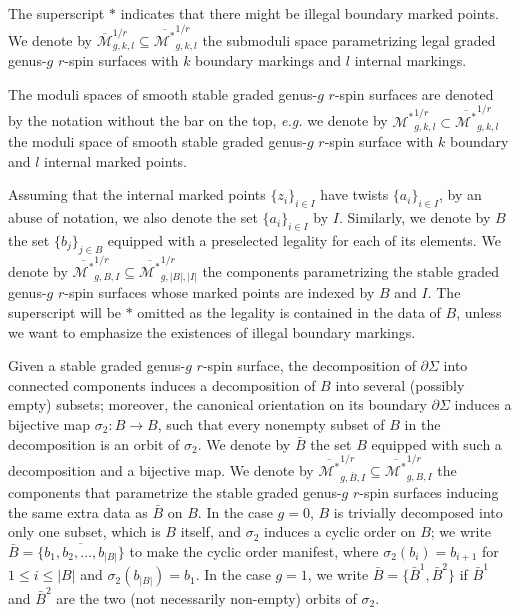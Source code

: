 \documentclass[11pt,a4paper]{article}
\theoremstyle{definition}
\theoremstyle{remark}
\numberwithin{equation}{section}
\def\Mbar{{\overline{\mathcal M}}}
\def\Mbarstar{{\overline{\mathcal M^*}}}
\begin{document}
The superscript $*$ indicates that there might be illegal boundary marked points. 
We denote by $\Mbar_{g,k,l}^{1/r}\subseteq \Mbarstar_{g,k,l}^{1/r}$ the submoduli space parametrizing legal graded genus-$g$ $r$-spin surfaces with $k$ boundary markings and $l$ internal markings. 

The moduli spaces of smooth stable graded genus-$g$ $r$-spin surfaces are denoted by the notation without the bar on the top, \textit{e.g.} we denote by ${\mathcal M^*}_{g,k,l}^{1/r} \subset {\Mbarstar}_{g,k,l}^{1/r}$ the moduli space of smooth stable graded genus-$g$ $r$-spin surface with $k$ boundary and $l$ internal marked points. 




Assuming that the internal marked points $\{z_i\}_{i\in I}$ have twists $\{a_i\}_{i\in I}$, by an abuse of notation, we also denote the set $\{a_i\}_{i\in I}$ by $I$.
Similarly, we denote by $B$ the set $\{b_j\}_{j\in B}$ equipped with a preselected legality for each of its elements. We denote by ${\Mbarstar}_{g,{B},I}^{1/r}\subseteq \Mbarstar_{g,\lvert B\rvert,\lvert I\rvert}^{1/r}$ the components parametrizing the stable graded genus-$g$ $r$-spin surfaces whose marked points are indexed by $B$ and $I$. The superscript will be $*$ omitted as the legality is contained in the data of $B$, unless we want to emphasize the existences of illegal boundary markings. 

Given a stable graded genus-$g$ $r$-spin surface, the decomposition of $\partial \Sigma$ into connected components induces a decomposition of $B$ into several (possibly empty) subsets; moreover, the canonical orientation on its boundary $\partial\Sigma$ induces a bijective map $\sigma_2\colon B\to B$, such that every nonempty subset of $B$ in the decomposition is an orbit of $\sigma_2$. We denote by $\bar{B}$ the set $B$ equipped with such a decomposition and a bijective map. We denote by ${\Mbarstar}_{g,\bar{B},I}^{1/r}\subseteq{\Mbarstar}_{g,{B},I}^{1/r}$ the components that parametrize the stable graded genus-$g$ $r$-spin surfaces inducing the same extra data as $\bar{B}$ on $B$. 
In the case $g=0$, $B$ is trivially decomposed into only one subset, which is $B$ itself, and $\sigma_2$ induces a cyclic order on $B$; we write $\bar{B}=\overline{\{b_1,b_2,\dots,b_{\lvert B \rvert}\}}$ to make the cyclic order manifest, where $\sigma_2(b_i)=b_{i+1}$ for $1\le i \le \lvert B \rvert$ and $\sigma_2(b_{\lvert B \rvert})=b_{1}$.
In the case $g=1$, we write $\bar{B}=\{\bar{B}^1,\bar{B}^2 \}$ if $\bar{B}^1$ and $\bar{B}^2$ are the two (not necessarily non-empty) orbits of $\sigma_2$.
\end{document}
